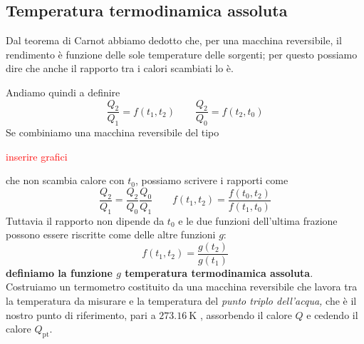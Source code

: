 \documentclass[x11names]{report}
\begin{document}
\subsection{Temperatura termodinamica assoluta}
Dal teorema di Carnot abbiamo dedotto che, per una macchina reversibile, il rendimento è funzione delle sole temperature delle sorgenti; per questo possiamo dire che anche il rapporto tra i calori scambiati lo è. 

Andiamo quindi a definire 
\[ 
\frac{Q_{2}}{Q_{1}} = f(t_{1},t_{2}) \qquad \frac{Q_{2}}{Q_{0}} = f(t_{2},t_{0}) 
\]
Se combiniamo una macchina reversibile del tipo
\begin{center}
	\textcolor{red}{inserire grafici}
\end{center}
che non scambia calore con \(t_{0}\), possiamo scrivere i rapporti come
\[ 
\frac{Q_{2}}{Q_{1}} = \frac{Q_{2}}{Q_{0}}\frac{Q_{0}}{Q_{1}} \qquad f(t_{1},t_{2}) = \frac{f(t_{0},t_{2})}{f(t_{1},t_{0})}
\]
Tuttavia il rapporto non dipende da \(t_{0}\) e le due funzioni dell'ultima frazione possono essere riscritte come delle altre funzioni \(g\):
\[ 
f(t_{1},t_{2}) = \frac{g(t_{2})}{g(t_{1})}
\]
\textbf{definiamo la funzione \(g\) temperatura termodinamica assoluta}. \\

\noindent
Costruiamo un termometro costituito da una macchina reversibile che lavora tra la temperatura da misurare e la temperatura del \textit{punto triplo dell'acqua,} che è il nostro punto di riferimento, pari a \(\SI{273.16}{\kelvin}\) , assorbendo il calore \(Q\) e cedendo il calore \(Q _{\text{pt}}\).
\end{document}
